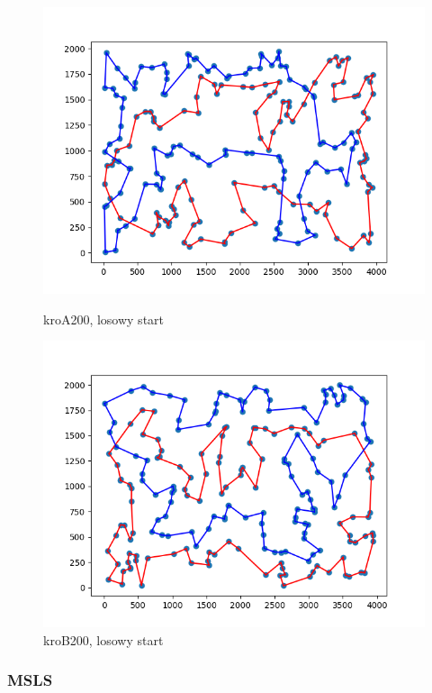 \documentclass[11pt]{article}
\begin{document}
\begin{figure}[H]
    \begin{minipage}[t]{0.45\textwidth}
        \centering
        \includegraphics[width=\linewidth]{best_paths/kroA200/ILS}
        \caption{kroA200, losowy start}
    \end{minipage}
    \hfill
    \begin{minipage}[t]{0.45\textwidth}
        \centering
        \includegraphics[width=\linewidth]{best_paths/kroB200/ILS}
        \caption{kroB200, losowy start}
    \end{minipage}\label{fig:figure1}
\end{figure}

\subsubsection{MSLS}
\end{document}

